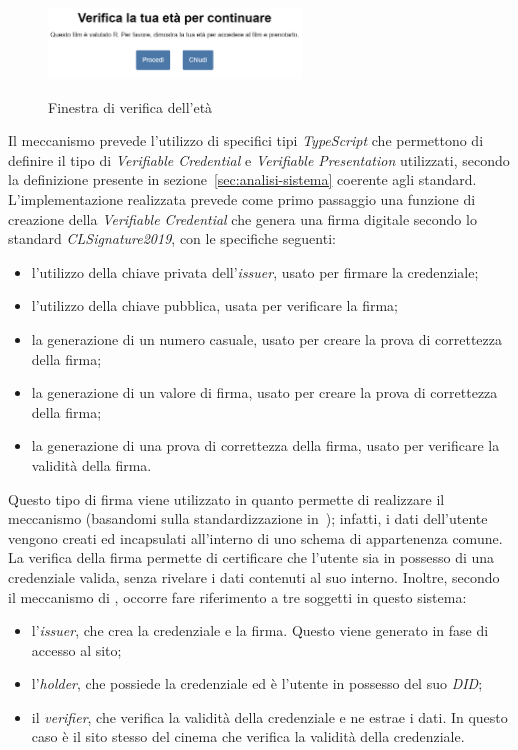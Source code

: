 \begin{figure}[ht]
    \centering
    \includegraphics[width=0.6\textwidth, alt={Finestra visualizzata di verifica dell'età}]{immagini/frontend/age-verification.png}
    \caption{Finestra di verifica dell'età}\label{fig:verifica-eta}
\end{figure}

Il meccanismo prevede l'utilizzo di specifici tipi \textit{TypeScript} che permettono di definire il tipo di \textit{Verifiable Credential} e \textit{Verifiable Presentation}
utilizzati, secondo la definizione presente in sezione~\ref{sec:analisi-sistema} coerente agli standard.
L'implementazione realizzata prevede come primo passaggio una funzione di creazione della \textit{Verifiable Credential} che genera una firma digitale secondo lo standard \textit{CLSignature2019}, con le specifiche seguenti:
\begin{itemize}
    \item l'utilizzo della chiave privata dell'\textit{issuer}, usato per firmare la credenziale;
    \item l'utilizzo della chiave pubblica, usata per verificare la firma;
    \item la generazione di un numero casuale, usato per creare la prova di correttezza della firma;
    \item la generazione di un valore di firma, usato per creare la prova di correttezza della firma;
    \item la generazione di una prova di correttezza della firma, usato per verificare la validità della firma.
\end{itemize}
Questo tipo di firma viene utilizzato in quanto permette di realizzare il meccanismo  (basandomi sulla standardizzazione in~\cite{site:zkpstandard}); infatti, i dati dell'utente vengono creati ed incapsulati
all'interno di uno schema di appartenenza comune. La verifica della firma permette di certificare che l'utente sia in possesso di una credenziale valida, senza rivelare
i dati contenuti al suo interno. 
Inoltre, secondo il meccanismo di , occorre fare riferimento a tre soggetti in questo sistema:
\begin{itemize}
    \item l'\textit{issuer}, che crea la credenziale e la firma. Questo viene generato in fase di accesso al sito;
    \item l'\textit{holder}, che possiede la credenziale ed è l'utente in possesso del suo \textit{DID};
    \item il \textit{verifier}, che verifica la validità della credenziale e ne estrae i dati. In questo caso è il sito stesso del cinema che verifica la validità della credenziale.
\end{itemize}

